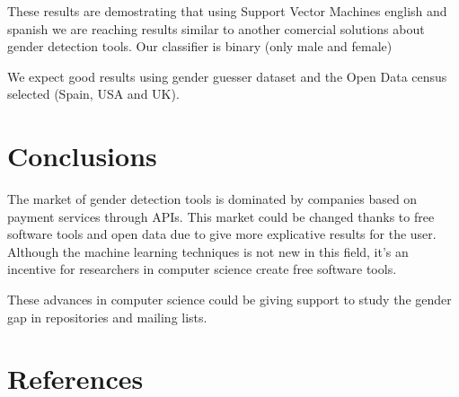 \documentclass[runningheads]{llncs}
\begin{document}
These results are demostrating that using Support Vector Machines
english and spanish we are reaching results similar to another
comercial solutions about gender detection tools. Our classifier is
binary (only male and female)

We expect good results using gender guesser dataset and the Open Data
census selected (Spain, USA and UK).

\section{Conclusions}

The market of gender detection tools is dominated by companies based
on payment services through APIs. This market could be changed thanks
to free software tools and open data due to give more explicative
results for the user. Although the machine learning techniques is not
new in this field, it's an incentive for researchers in computer
science create free software tools.

These advances in computer science could be giving support to study
the gender gap in repositories and mailing lists.

\section{References}

%
%
%





\end{document}
